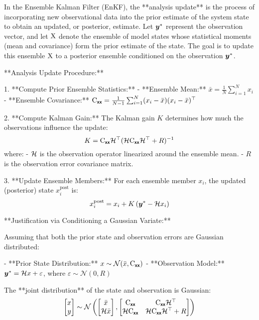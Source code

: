 \documentclass{article}
\begin{document}
{In the Ensemble Kalman Filter (EnKF), the **analysis update** is the process of incorporating new observational data into the prior estimate of the system state to obtain an updated, or posterior, estimate. Let \(\boldsymbol{y}^*\) represent the observation vector, and let \( \mathrm{X} \) denote the ensemble of model states whose statistical moments (mean and covariance) form the prior estimate of the state. The goal is to update this ensemble \( \mathrm{X} \) to a posterior ensemble conditioned on the observation \(\boldsymbol{y}^*\).

**Analysis Update Procedure:**

1. **Compute Prior Ensemble Statistics:**
   - **Ensemble Mean:** \( \bar{x} = \frac{1}{N} \sum_{i=1}^{N} x_i \)
   - **Ensemble Covariance:** \( \mathrm{C}_{\boldsymbol{\mathsf{xx}}} = \frac{1}{N-1} \sum_{i=1}^{N} (x_i - \bar{x})(x_i - \bar{x})^\top \)

2. **Compute Kalman Gain:**
   The Kalman gain \( K \) determines how much the observations influence the update:
   \[
   K = \mathrm{C}_{\boldsymbol{\mathsf{xx}}} \mathcal{H}^\top (\mathcal{H} \mathrm{C}_{\boldsymbol{\mathsf{xx}}} \mathcal{H}^\top + R)^{-1}
   \]
   where:
   - \( \mathcal{H} \) is the observation operator linearized around the ensemble mean.
   - \( R \) is the observation error covariance matrix.

3. **Update Ensemble Members:**
   For each ensemble member \( x_i \), the updated (posterior) state \( x_i^\text{post} \) is:
   \[
   x_i^\text{post} = x_i + K \left(\boldsymbol{y}^*- \mathcal{H} x_i \right)
   \]

**Justification via Conditioning a Gaussian Variate:**

Assuming that both the prior state and observation errors are Gaussian distributed:

- **Prior State Distribution:** \( x \sim \mathcal{N}(\bar{x},  \mathrm{C}_{\boldsymbol{\mathsf{xx}}} ) \)
- **Observation Model:** \(\boldsymbol{y}^*= \mathcal{H} x + \varepsilon \), where \( \varepsilon \sim \mathcal{N}(0, R) \)

The **joint distribution** of the state and observation is Gaussian:
\[
\begin{bmatrix}
x \\
y
\end{bmatrix}
\sim \mathcal{N}\left(
\begin{bmatrix}
\bar{x} \\
\mathcal{H} \bar{x}
\end{bmatrix},
\begin{bmatrix}
 \mathrm{C}_{\boldsymbol{\mathsf{xx}}}  & \mathrm{C}_{\boldsymbol{\mathsf{xx}}} \mathcal{H}^\top \\
\mathcal{H} \mathrm{C}_{\boldsymbol{\mathsf{xx}}} & \mathcal{H} \mathrm{C}_{\boldsymbol{\mathsf{xx}}} \mathcal{H}^\top + R
\end{bmatrix}
\right)
\]

}
\end{document}
